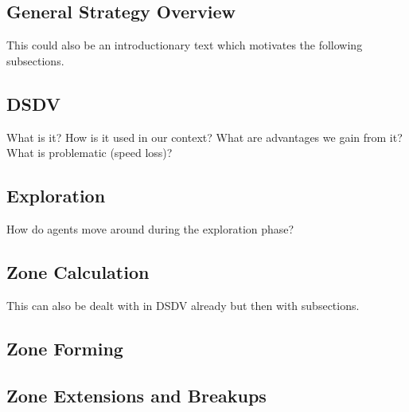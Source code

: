 \subsection{General Strategy Overview}
This could also be an introductionary text which motivates the following subsections.
\subsection{DSDV}
What is it? How is it used in our context? What are advantages we gain from it? What is problematic (speed loss)?
\subsection{Exploration}
How do agents move around during the exploration phase?
\subsection{Zone Calculation}
This can also be dealt with in DSDV already but then with subsections.
\subsection{Zone Forming}
\subsection{Zone Extensions and Breakups}
